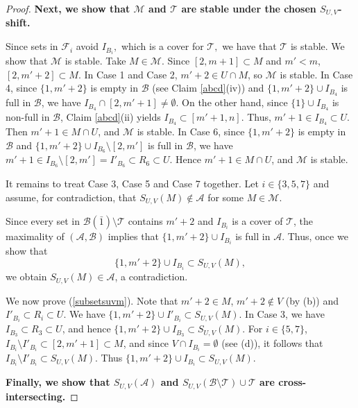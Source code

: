 \documentclass[11pt]{article}
\def\marrow{{\boldmath {\marginpar[\hfill$\rightarrow \rightarrow$]{$\leftarrow \leftarrow$}}}}
\def\andrey#1{{\sc Andrey: }{\marrow\sf \textcolor{blue}{#1}}}
\newcommand{\m}{\mathcal}
\begin{document}
\begin{proof}



{\bf Next, we show that $\m M$ and $\m T$ are stable under the chosen $S_{U,V}$-shift. }

Since sets in $\m F_i$ avoid $I_{B_i},$ which is a cover for $\m T,$ we have that $\m T$ is stable. 
We show that $\m M$ is stable. Take $M\in\m M$.
Since $[2,m+1]\subset M$ and $m'<m$, $[2,m'+2]\subset M $.
In Case 1 and Case 2, $m'+2\in U \cap M$, so $\m M$ is stable. In Case 4, since $\{1,m'+2\}$ is empty in $\m B$ (see Claim \ref{abcd}(iv)) and $\{1,m'+2\}\cup I_{B_4}$ is full in $\m B$, we have $I_{B_4}\cap [2,m'+1]\ne \emptyset$.
On the other hand, since $\{1\}\cup I_{B_4}$ is non-full in $\m B$, Claim \ref{abcd}(ii) yields $I_{B_4}\subset [m'+1,n]$. Thus, $m'+1\in I_{B_4}\subset U$. Then $m'+1\in M \cap U$, and $\m M$ is stable.  
In Case 6, since $\{1,m'+2\}$ is empty in $\m B$ and $\{1,m'+2\}\cup I_{B_6}\setminus [2,m']$ is full in $\m B$, 
we have $m'+1\in I_{B_6}\setminus [2,m']=I'_{B_6}\subset R_6\subset U$. Hence $m'+1\in M \cap U$, and $\m M$ is stable.

It remains to treat Case 3, Case 5 and Case 7 together. Let $i\in \{3,5,7\}$ and assume, for contradiction, that $S_{U,V}(M)\not\in \m A$ for some $M\in \m M$. 
  
Since every set in $\m B(\bar{1})\setminus \m T$ contains $m'+2$ and $I_{B_i}$ is a cover of $\m T$, the maximality of $(\m A, \m B)$ implies that $\{1,m'+2\} \cup I_{B_i}$ is full in $\m A$. 
Thus, once we show that
\begin{equation}\label{subsetsuvm}
    \{1,m'+2\}\cup I_{B_i}\subset S_{U,V}(M),
\end{equation}
we obtain $S_{U,V}(M)\in \m A$, a contradiction. 

We now prove (\ref{subsetsuvm}).
Note that $m'+2\in M$, $m'+2\not\in V$ (by (b)) and $I'_{B_i}\subset R_i\subset U$. We have $\{1,m'+2\}\cup I'_{B_i}\subset S_{U,V}(M)$. 
In Case 3, we have $I_{B_3}\subset R_3 \subset U$, and hence $\{1,m'+2\}\cup I_{B_3}\subset S_{U,V}(M)$. 
For $i\in \{5,7\}$, $I_{B_i}\setminus I'_{B_i}\subset [2,m'+1]\subset M$, and since $V\cap I_{B_i}=\emptyset$ (see (d)), it follows that $I_{B_i}\setminus I'_{B_i}\subset S_{U,V}(M)$. 
Thus $\{1,m'+2\}\cup I_{B_i}\subset S_{U,V}(M)$.

{\bf Finally,  we show that $S_{U,V}(\m A)$ and $S_{U,V}(\m B\setminus \m T)\cup \m T$
are cross-intersecting.} 


\end{proof}
\end{document}
